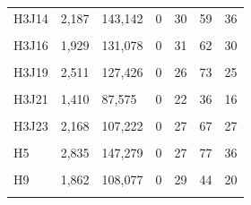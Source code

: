 \documentclass[
  a4paper,
  titlepage]{article}
\begin{document}
\begin{longtable}[t]{lllllll}
H3J14 & 2,187 & 143,142 & 0 & 30 & 59 & 36\\
 
\cellcolor{gray!6}{H3J15} & \cellcolor{gray!6}{2,816} & \cellcolor{gray!6}{153,564} & \cellcolor{gray!6}{0} & \cellcolor{gray!6}{34} & \cellcolor{gray!6}{79} & \cellcolor{gray!6}{42}\\
 
H3J16 & 1,929 & 131,078 & 0 & 31 & 62 & 30\\
 
\cellcolor{gray!6}{H3J18} & \cellcolor{gray!6}{2,361} & \cellcolor{gray!6}{130,539} & \cellcolor{gray!6}{0} & \cellcolor{gray!6}{22} & \cellcolor{gray!6}{63} & \cellcolor{gray!6}{37}\\
 
H3J19 & 2,511 & 127,426 & 0 & 26 & 73 & 25\\
 
\cellcolor{gray!6}{H3J20} & \cellcolor{gray!6}{1,970} & \cellcolor{gray!6}{132,704} & \cellcolor{gray!6}{0} & \cellcolor{gray!6}{29} & \cellcolor{gray!6}{53} & \cellcolor{gray!6}{18}\\
 
H3J21 & 1,410 & 87,575 & 0 & 22 & 36 & 16\\
 
\cellcolor{gray!6}{H3J22} & \cellcolor{gray!6}{1,551} & \cellcolor{gray!6}{101,408} & \cellcolor{gray!6}{0} & \cellcolor{gray!6}{27} & \cellcolor{gray!6}{37} & \cellcolor{gray!6}{27}\\
 
H3J23 & 2,168 & 107,222 & 0 & 27 & 67 & 27\\
 
\cellcolor{gray!6}{H4} & \cellcolor{gray!6}{1,562} & \cellcolor{gray!6}{119,399} & \cellcolor{gray!6}{0} & \cellcolor{gray!6}{25} & \cellcolor{gray!6}{45} & \cellcolor{gray!6}{20}\\
 
H5 & 2,835 & 147,279 & 0 & 27 & 77 & 36\\
 
\cellcolor{gray!6}{H8} & \cellcolor{gray!6}{1,564} & \cellcolor{gray!6}{114,023} & \cellcolor{gray!6}{0} & \cellcolor{gray!6}{20} & \cellcolor{gray!6}{36} & \cellcolor{gray!6}{22}\\
 
H9 & 1,862 & 108,077 & 0 & 29 & 44 & 20\\
 
\cellcolor{gray!6}{H10} & \cellcolor{gray!6}{3,328} & \cellcolor{gray!6}{180,702} & \cellcolor{gray!6}{0} & \cellcolor{gray!6}{43} & \cellcolor{gray!6}{89} & \cellcolor{gray!6}{35}\\
 

\end{longtable}
\end{document}
